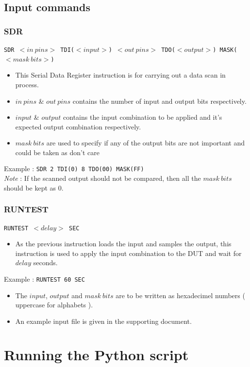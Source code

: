 \documentclass{beamer}
\begin{document}
\subsection{Input commands}
\begin{frame}
\frametitle{SDR}
\texttt{SDR $<in\:pins>$ TDI($<input>$) $<out\:pins>$ TDO($<output>$) MASK($<mask\:bits>$)}
\vspace*{0.3cm}
\begin{itemize}
\item This Serial Data Register instruction is for carrying out a data scan in process.
\item $in\:pins$ \& $out\:pins$ contains the number of input and output bits respectively.
\item $input$ \& $output$ contains the input combination to be applied and it's expected output combination respectively.
\item  $mask\:bits$ are used to specify if any of the output bits are not important and could be taken as don't care
\end{itemize}
Example : \texttt{SDR 2 TDI(0) 8 TDO(00) MASK(FF)}\\
\textit{Note} : If the scanned output should not be compared, then all the $mask\:bits$ should be kept as 0.
\end{frame}

\begin{frame}
\frametitle{RUNTEST}
\texttt{RUNTEST $<delay>$ SEC}
\begin{itemize}
\item As the previous instruction loads the input and samples the output, this instruction is used to apply the input combination to the DUT and wait for $delay$ seconds.
\end{itemize}
Example : \texttt{RUNTEST 60 SEC}
\begin{itemize}
\item The $input$, $output$ and $mask\:bits$ are to be written as hexadecimel numbers ( uppercase for alphabets ).
\item An example input file is given in the supporting document.
\end{itemize}

\end{frame}
\section{Running the Python script}
\end{document}
